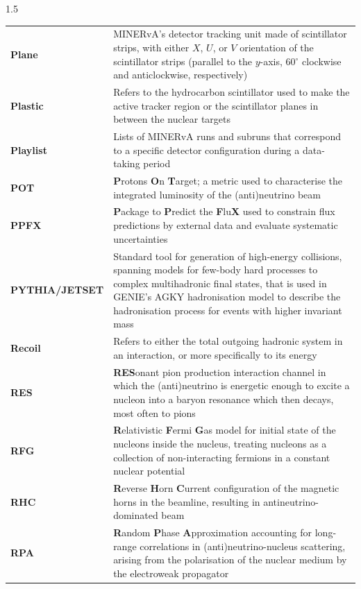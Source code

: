 \begin{spacing}{1.5}
\begin{longtable}[l]{p{} p{}}
        \textbf{Plane} & MINERvA's detector tracking unit made of scintillator strips, with either $X$, $U$, or $V$ orientation of the scintillator strips (parallel to the $y$-axis, 60$^{\circ}$ clockwise and anticlockwise, respectively)   \\
        \textbf{Plastic} & Refers to the hydrocarbon scintillator used to make the active tracker region or the scintillator planes in between the nuclear targets  \\
        \textbf{Playlist} & Lists of MINERvA runs and subruns that correspond to a specific detector configuration during a data-taking period \\
        \textbf{POT} & \textbf{P}rotons \textbf{O}n \textbf{T}arget; a metric used to characterise the integrated luminosity of the (anti)neutrino beam \\
        \textbf{PPFX} & \textbf{P}ackage to \textbf{P}redict the \textbf{F}lu\textbf{X} used to constrain flux predictions by external data and evaluate systematic uncertainties  \\
        \textbf{PYTHIA/JETSET} & Standard tool for generation of high-energy collisions, spanning models for few-body hard processes to complex multihadronic final states, that is used in GENIE's AGKY hadronisation model to describe the hadronisation process for events with higher invariant mass \\
        \textbf{Recoil} & Refers to either the total outgoing hadronic system in an interaction, or more specifically to its energy \\
        \textbf{RES} & \textbf{RES}onant pion production interaction channel in which the (anti)neutrino is energetic enough to excite a nucleon into a baryon resonance which then decays, most often to pions \\
        \textbf{RFG} & \textbf{R}elativistic \textbf{F}ermi \textbf{G}as model for initial state of the nucleons inside the nucleus, treating nucleons as a collection of non-interacting fermions in a constant nuclear potential \\
        \textbf{RHC} & \textbf{R}everse \textbf{H}orn \textbf{C}urrent configuration of the magnetic horns in the beamline, resulting in antineutrino-dominated beam   \\
        \textbf{RPA} & \textbf{R}andom \textbf{P}hase \textbf{A}pproximation accounting for long-range correlations in (anti)neutrino-nucleus scattering, arising from the polarisation of the nuclear medium by the electroweak propagator \\

\end{longtable}
\end{spacing}
